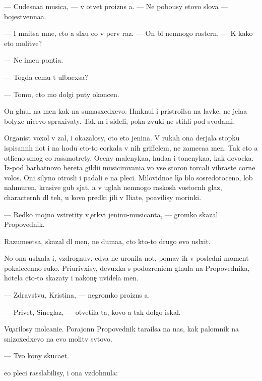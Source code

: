 \documentclass[10pt]{book}
\begin{document}
— Cudesna{\y}a musica, — v otvet proizn{\e}s {\y}a. — Ne pobo{\y}usy etovo slova — bojestvenna{\y}a.

— I mnitsa mne, cto {\y}a sl{\yi}xu {\y}e{\y}o v perv{\yi}{\y} raz. — On b{\yi}l nemnogo raster{\ia}n. — K kako{\y} eto molitve?

— Ne ime{\y}u pon{\ia}ti{\y}a.

— Togda cemu t{\yi} ul{\yi}ba{\y}exsa?

— Tomu, cto mo{\y} dolgi{\y} puty okoncen.

On gl{\ia}nul na men{\ia} kak na sumasxedxevo. Hm{\yi}knul i pristro{\y}ilsa na lavke, ne jela{\y}a bolyxe nicevo spraxivaty. Tak m{\yi} i sideli, poka zvuki ne stihli pod svodami.

Organist  voxol v zal, i okazalosy, cto eto jen{\x}ina. V rukah ona derjala stopku ispisann{\yi}h not i na hodu cto-to corkala v nih griffelem, ne zameca{\y}a men{\ia}. Tak cto {\y}a otlicno smog {\y}e{\y}o rassmotrety. Oceny malenyka{\y}a, huda{\y}a i tonenyka{\y}a, kak devocka. Iz-pod barhatnovo bereta gildi{\y}i musicirovani{\y}a vo vse storon{\yi} torcali vihrast{\yi}{\y}e corn{\yi}{\y}e volos{\yi}. Oni silyno otrosli i padali {\y}e{\y} na pleci. Milovidno{\y}e li{\c}o b{\yi}lo sosredotoceno, lob nahmuren, krasiv{\yi}{\y}e gub{\yi} sjat{\yi}, a v uglah nemnogo raskos{\yi}h vostocn{\yi}h glaz, charactern{\yi}h dl{\ia} teh, u kovo predki jili v Iliate, po{\y}avilisy mor{\x}inki.

— Redko mojno vstretity v {\c}erkvi jen{\x}inu-musicanta, — gromko skazal Propovednik.

Razume{\y}etsa, skazal dl{\ia} men{\ia}, ne duma{\y}a, cto kto-to drugo{\y} {\y}evo usl{\yi}xit.

No ona usl{\yi}xala i, vzdrognuv, {\y}edva ne uronila not{\yi}, po{\y}mav ih v posledni{\y} moment pokalecenno{\y} ruko{\y}. Pri{\x}urivxisy, devuxka s podozreni{\y}em gl{\ia}nula na Propovednika, hotela cto-to skazaty i nakone{\c} uvidela men{\ia}.

— Zdravstvu{\y}, Kristina, — negromko proizn{\e}s {\y}a.

— Privet, Sineglaz{\yi}{\y}, — otvetila ta, kovo {\y}a tak dolgo iskal.

Vo{\c}arilosy molcani{\y}e. Porajonn{\yi}{\y} Propovednik tara{\x}ilsa na nas, kak palomnik na snizoxedxevo na {\y}evo molitv{\yi} sv{\ia}tovo.

— Tvo{\y} kony skuca{\y}et.

{\Y}e{\y}o pleci rasslabilisy, i ona vzdohnula:
\end{document}
